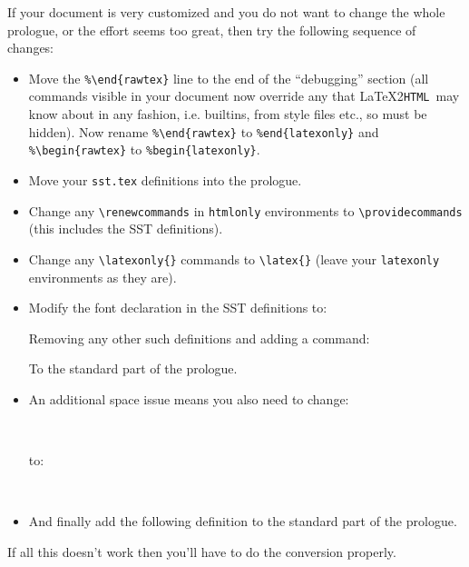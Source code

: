 \documentclass[twoside,11pt,nolof]{starlink}
\providecommand{\latextohtml}{\LaTeX2\texttt{HTML}}
\begin{document}
If your document is very customized and you do not want to change the whole
prologue, or the effort seems too great, then try the following sequence of
changes:
\begin{itemize}
\item Move the \verb#%#\verb#\end{rawtex}# line to the end of the
      ``debugging'' section (all commands visible in your document now
      override any that \latextohtml\ may know about in any fashion,
      i.e. builtins, from style files etc., so must be hidden). Now
      rename \verb#%#\verb#\end{rawtex}# to \verb#%#\verb#end{latexonly}#
      and \verb#%#\verb#\begin{rawtex}# to \verb#%#\verb#begin{latexonly}#.
\item Move your \verb#sst.tex# definitions into the prologue.
\item Change any \verb#\renewcommands# in \verb#htmlonly# environments
      to \verb#\providecommands# (this includes the SST definitions).
\item Change any \verb#\latexonly{}# commands to \verb#\latex{}#
(leave your \verb#latexonly# environments as they are).
\item Modify the font declaration in the SST definitions to:
\begin{terminalv}
  \html{\providecommand{\ssttt}{\tt}}
\end{terminalv}
Removing any other such definitions and adding a command:
\begin{terminalv}
  \providecommand{\html}[1]{}
\end{terminalv}
To the standard part of the prologue.
\item An additional space issue means you also need to change:
\begin{terminalv}
  \stardoccategory \stardocnumber \\
\end{terminalv}
to:
\begin{terminalv}
  \stardoccategory\ \stardocnumber \\
\end{terminalv}
\item And finally add the following definition to the standard part of
      the prologue.
\begin{terminalv}
 \providecommand{\latexhtml}[2]{#1}
\end{terminalv}
\end{itemize}
If all this doesn't work then you'll have to do the conversion properly.
\end{document}
